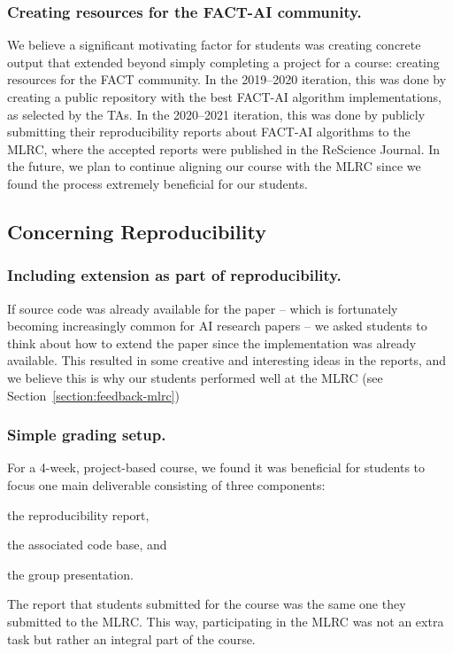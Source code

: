 \documentclass[letterpaper]{article}
\begin{document}
\subsubsection{Creating resources for the FACT-AI community.}
We believe a significant motivating factor for students was creating concrete output that extended beyond simply completing a project for a course: creating resources for the FACT community.
In the 2019--2020 iteration, this was done by creating a public repository with the best FACT-AI algorithm implementations, as selected by the TAs.
In the 2020--2021 iteration, this was done by publicly submitting their reproducibility reports about FACT-AI algorithms to the MLRC, where the accepted reports were published in the ReScience Journal.
In the future, we plan to continue aligning our course with the MLRC since we found the process extremely beneficial for our students.


\subsection{Concerning Reproducibility}

\subsubsection{Including extension as part of reproducibility.}
If source code was already available for the paper -- which is fortunately becoming increasingly common for AI research papers -- we asked students to think about how to extend the paper since the implementation was already available. This resulted in some creative and interesting ideas in the reports, and we believe this is why our students performed well at the MLRC (see Section~\ref{section:feedback-mlrc})

\subsubsection{Simple grading setup.}
For a 4-week, project-based course, we found it was beneficial for students to focus one main deliverable consisting of three components:
\begin{enumerate*}[label=(\roman*)]
\item the reproducibility report,
\item the associated code base, and
\item the group presentation.
\end{enumerate*}
The report that students submitted for the course was the same one they submitted to the MLRC. This way, participating in the MLRC was not an extra task but rather an integral part of the course.
\end{document}

